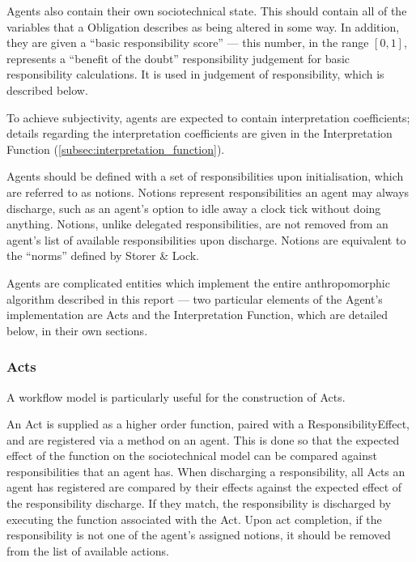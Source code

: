 Agents also contain their own sociotechnical state. This should contain all of the variables that a Obligation describes as being altered in some way. In addition, they are given a ``basic responsibility score'' --- this number, in the range \([0,1]\), represents a ``benefit of the doubt'' responsibility judgement for basic responsibility calculations. It is used in judgement of responsibility, which is described below.\par

To achieve subjectivity, agents are expected to contain interpretation coefficients; details regarding the interpretation coefficients are given in the Interpretation Function (\cref{subsec:interpretation_function}).\par

Agents should be defined with a set of responsibilities upon initialisation, which are referred to as notions. Notions represent responsibilities an agent may always discharge, such as an agent's option to idle away a clock tick without doing anything. Notions, unlike delegated responsibilities, are not removed from an agent's list of available responsibilities upon discharge. Notions are equivalent to the ``norms'' defined by Storer \& Lock\cite{storer2008modelling}.\par

Agents are complicated entities which implement the entire anthropomorphic algorithm described in this report --- two particular elements of the Agent's implementation are Acts and the Interpretation Function, which are detailed below, in their own sections.

\subsubsection{Acts}
A workflow model is particularly useful for the construction of Acts.\par

An Act is supplied as a higher order function, paired with a ResponsibilityEffect, and are registered via a method on an agent. This is done so that the expected effect of the function on the sociotechnical model can be compared against responsibilities that an agent has. When discharging a responsibility, all Acts an agent has registered are compared by their effects against the expected effect of the responsibility discharge. If they match, the responsibility is discharged by executing the function associated with the Act. Upon act completion, if the responsibility is not one of the agent's assigned notions, it should be removed from the list of available actions.\par

